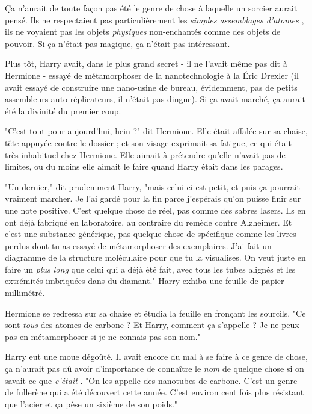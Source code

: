 Ça n'aurait de toute façon pas été le genre de chose à laquelle un sorcier aurait pensé. Ils ne respectaient pas particulièrement les \emph{simples assemblages d'atomes} , ils ne voyaient pas les objets \emph{physiques}  non-enchantés comme des objets de pouvoir. Si ça n'était pas magique, ça n'était pas intéressant.

Plus tôt, Harry avait, dans le plus grand secret - il ne l'avait même pas dit à Hermione - essayé de métamorphoser de la nanotechnologie à la Éric Drexler (il avait essayé de construire une nano-usine de bureau, évidemment, pas de petits assembleurs auto-réplicateurs, il n'était pas dingue). Si ça avait marché, ça aurait été la divinité du premier coup.

"C'est tout pour aujourd'hui, hein ?" dit Hermione. Elle était affalée sur sa chaise, tête appuyée contre le dossier ; et son visage exprimait sa fatigue, ce qui était très inhabituel chez Hermione. Elle aimait à prétendre qu'elle n'avait pas de limites, ou du moins elle aimait le faire quand Harry était dans les parages.

"Un dernier," dit prudemment Harry, "mais celui-ci est petit, et puis ça pourrait vraiment marcher. Je l'ai gardé pour la fin parce j'espérais qu'on puisse finir sur une note positive. C'est quelque chose de réel, pas comme des sabres lasers. Ils en ont déjà fabriqué en laboratoire, au contraire du remède contre Alzheimer. Et c'est une substance générique, pas quelque chose de spécifique comme les livres perdus dont tu as essayé de métamorphoser des exemplaires. J'ai fait un diagramme de la structure moléculaire pour que tu la visualises. On veut juste en faire un \emph{plus long}  que celui qui a déjà été fait, avec tous les tubes alignés et les extrémités imbriquées dans du diamant." Harry exhiba une feuille de papier millimétré.

Hermione se redressa sur sa chaise et étudia la feuille en fronçant les sourcils. "Ce sont \emph{tous}  des atomes de carbone ? Et Harry, comment ça s'appelle ? Je ne peux pas en métamorphoser si je ne connais pas son nom."

Harry eut une moue dégoûté. Il avait encore du mal à se faire à ce genre de chose, ça n'aurait pas dû avoir d'importance de connaître le \emph{nom}  de quelque chose si on savait ce que \emph{c'était} . "On les appelle des nanotubes de carbone. C'est un genre de fullerène qui a été découvert cette année. C'est environ cent fois plus résistant que l'acier et ça pèse un sixième de son poids."

